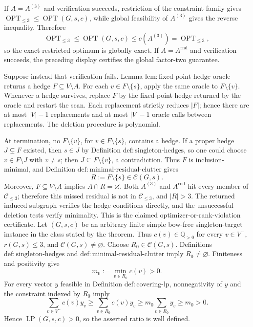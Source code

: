 If \(A=A^{(3)}\) and verification succeeds, restriction of the constraint family gives \(\operatorname{OPT}_{\leq3}\leq\operatorname{OPT}(G,s,c)\), while global feasibility of \(A^{(3)}\) gives the reverse inequality.  Therefore
\[
 \operatorname{OPT}_{\leq3}
 \leq\operatorname{OPT}(G,s,c)
 \leq c(A^{(3)})
 =\operatorname{OPT}_{\leq3},
\]
so the exact restricted optimum is globally exact.  If \(A=A^{\mathrm{rnd}}\) and verification succeeds, the preceding display certifies the global factor-two guarantee.

Suppose instead that verification fails.  Lemma \(\mathrm{lem{:}fixed\mbox{-}point\mbox{-}hedge\mbox{-}oracle}\) returns a hedge \(F\subseteq V\setminus A\).  For each \(v\in F\setminus\{s\}\), apply the same oracle to \(F\setminus\{v\}\).  Whenever a hedge survives, replace \(F\) by the fixed-point hedge returned by the oracle and restart the scan.  Each replacement strictly reduces \(|F|\); hence there are at most \(|V|-1\) replacements and at most \(|V|-1\) oracle calls between replacements.  The deletion procedure is polynomial.

At termination, no \(F\setminus\{v\}\), for \(v\in F\setminus\{s\}\), contains a hedge.  If a proper hedge \(J\subsetneq F\) existed, then \(s\in J\) by Definition \(\mathrm{def{:}singleton\mbox{-}hedges}\), so one could choose \(v\in F\setminus J\) with \(v\neq s\); then \(J\subseteq F\setminus\{v\}\), a contradiction.  Thus \(F\) is inclusion-minimal, and Definition \(\mathrm{def{:}minimal\mbox{-}residual\mbox{-}clutter}\) gives
\[
 R:=F\setminus\{s\}\in\mathcal C(G,s).
\]
Moreover, \(F\subseteq V\setminus A\) implies \(A\cap R=\varnothing\).  Both \(A^{(3)}\) and \(A^{\mathrm{rnd}}\) hit every member of \(\mathcal C_{\leq3}\); therefore this missed residual is not in \(\mathcal C_{\leq3}\), and \(|R|>3\).  The returned induced subgraph verifies the hedge conditions directly, and the unsuccessful deletion tests verify minimality.  This is the claimed optimizer-or-rank-violation certificate.
Let \((G,s,c)\) be an arbitrary finite simple bow-free singleton-target instance in the class stated by the theorem.  Thus \(c(v)\in\mathbb Q_{>0}\) for every \(v\in V^{-}\), \(r(G,s)\leq3\), and \(\mathcal C(G,s)\neq\varnothing\).  Choose \(R_0\in\mathcal C(G,s)\).  Definitions \(\mathrm{def{:}singleton\mbox{-}hedges}\) and \(\mathrm{def{:}minimal\mbox{-}residual\mbox{-}clutter}\) imply \(R_0\neq\varnothing\).  Finiteness and positivity give
\[
 m_0:=\min_{v\in R_0}c(v)>0.
\]
For every vector \(y\) feasible in Definition \(\mathrm{def{:}covering\mbox{-}lp}\), nonnegativity of \(y\) and the constraint indexed by \(R_0\) imply
\[
 \sum_{v\in V^{-}}c(v)y_v
 \geq\sum_{v\in R_0}c(v)y_v
 \geq m_0\sum_{v\in R_0}y_v
 \geq m_0>0.
\]
Hence \(\operatorname{LP}(G,s,c)>0\), so the asserted ratio is well defined.

